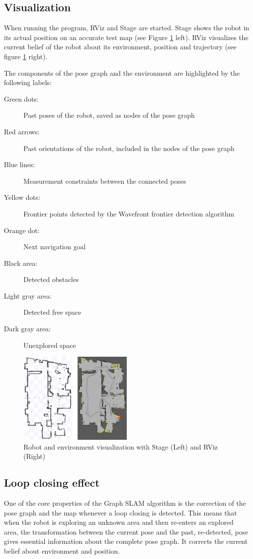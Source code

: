 \documentclass{ba-kecs}
\begin{document}
\subsection{Visualization}
\label{sec:visual}
When running the program, RViz and Stage are started. Stage shows the robot in its actual position on an accurate test map (see Figure \ref{fig:stage_and_rviz} left). RViz visualizes the current belief of the robot about its environment, position and trajectory (see figure \ref{fig:stage_and_rviz} right).

The components of the pose graph and the environment are highlighted by the following labels:

\begin{description}
\item[Green dots:]Past poses of the robot, saved as nodes of the pose graph
\item[Red arrows:]Past orientations of the robot, included in the nodes of the pose graph
\item[Blue lines:]Measurement constraints between the connected poses
\item[Yellow dots:]Frontier points detected by the Wavefront frontier detection algorithm
\item[Orange dot:]Next navigation goal
\item[Black area:]Detected obstacles
\item[Light gray area:]Detected free space
\item[Dark gray area:]Unexplored space
\end{description}

\begin{figure}[htbp]
	\centering
		\includegraphics[width=0.50\textwidth]{figures/Stage_and_rviz.jpg}
	\caption{Robot and environment visualization with Stage (Left) and RViz (Right)}
	\label{fig:stage_and_rviz}
\end{figure}

\subsection{Loop closing effect}
\label{sec:loopClosing}
One of the core properties of the Graph SLAM algorithm is the correction of the pose graph and the map whenever a loop closing is detected. This means that when the robot is exploring an unknown area and then re-enters an explored area, the transformation between the current pose and the past, re-detected, pose gives essential information about the complete pose graph. It corrects the current belief about environment and position.
\end{document}
